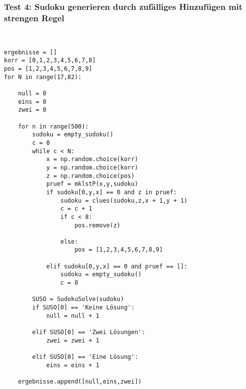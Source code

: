 \documentclass[11pt,a4paper]{article}
\begin{document}
\subsubsection{Test 4: Sudoku generieren durch zufälliges Hinzufügen mit strengen Regel}
\ \\
\begin{verbatim}
ergebnisse = []                          
korr = [0,1,2,3,4,5,6,7,8]               
pos = [1,2,3,4,5,6,7,8,9]                
for N in range(17,82):                   

    null = 0                             
    eins = 0                             
    zwei = 0                             
    
    for n in range(500):                 
        sudoku = empty_sudoku()          
        c = 0                            
        while c < N:                                  
            x = np.random.choice(korr)                
            y = np.random.choice(korr)                
            z = np.random.choice(pos)                
            pruef = mklstP(x,y,sudoku)                
            if sudoku[0,y,x] == 0 and z in pruef:     
                sudoku = clues(sudoku,z,x + 1,y + 1)  
                c = c + 1                             
                if c < 8:                             
                    pos.remove(z)                     
                                                      
                else:                                 
                    pos = [1,2,3,4,5,6,7,8,9]         
                    
            elif sudoku[0,y,x] == 0 and pruef == []:  
                sudoku = empty_sudoku()               
                c = 0                                 

        SUSO = SudokuSolve(sudoku)         
        if SUSO[0] == 'Keine Lösung':      
            null = null + 1                
                                           
        elif SUSO[0] == 'Zwei Lösungen':   
            zwei = zwei + 1                
                                           
        elif SUSO[0] == 'Eine Lösung':     
            eins = eins + 1                
    
    ergebnisse.append([null,eins,zwei])    
\end{verbatim}
\ \\
\end{document}
